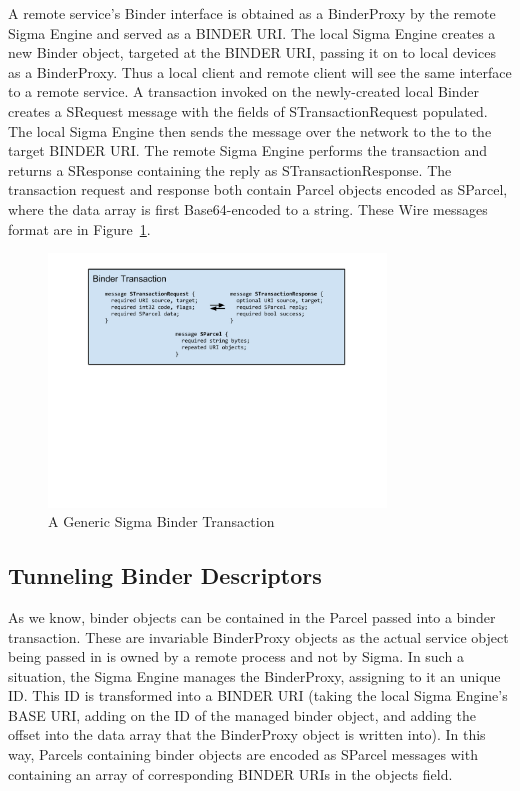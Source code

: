 \documentclass[prodmode]{acmlarge}
\begin{document}
A remote service's Binder interface is obtained as a BinderProxy by the remote Sigma Engine and served as a BINDER URI. The local Sigma Engine creates a new Binder object, targeted at the BINDER URI, passing it on to local devices as a BinderProxy. Thus a local client and remote client will see the same interface to a remote service. A transaction invoked on the newly-created local Binder creates a SRequest message with the fields of STransactionRequest populated. The local Sigma Engine then sends the message over the network to the to the target BINDER URI. The remote Sigma Engine performs the transaction and returns a SResponse containing the reply as STransactionResponse. The transaction request and response both contain Parcel objects encoded as SParcel, where the data array is first Base64-encoded to a string. These Wire messages format are in Figure~\ref{fig:GenericSigmaBinderTransaction}.

\begin{figure}[h!]
\centering
\includegraphics[width=0.8\textwidth]{drawings/WireBinderTransaction.pdf}
\caption{A Generic Sigma Binder Transaction}
\label{fig:GenericSigmaBinderTransaction}
\end{figure}

\subsection{Tunneling Binder Descriptors}
As we know, binder objects can be contained in the Parcel passed into a binder transaction. These are invariable BinderProxy objects as the actual service object being passed in is owned by a remote process and not by Sigma. In such a situation, the Sigma Engine manages the BinderProxy, assigning to it an unique ID. This ID is transformed into a BINDER URI (taking the local Sigma Engine's BASE URI, adding on the ID of the managed binder object, and adding the offset into the data array that the BinderProxy object is written into). In this way, Parcels containing binder objects are encoded as SParcel messages with containing an array of corresponding BINDER URIs in the objects field.
\end{document}
